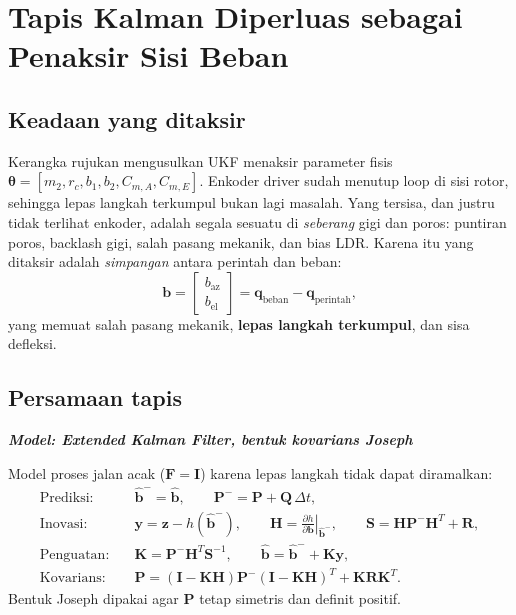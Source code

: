 \documentclass[11pt,a4paper]{article}
\newcommand{\model}[1]{\textbf{\textit{Model: #1}}}
\begin{document}
\section{Tapis Kalman Diperluas sebagai Penaksir Sisi Beban}
\label{sec:ekf}

\subsection{Keadaan yang ditaksir}

Kerangka rujukan mengusulkan UKF menaksir parameter fisis
$\bm{\theta} = [m_2, r_c, b_1, b_2, C_{m,A}, C_{m,E}]$. Enkoder driver sudah menutup loop di sisi rotor,
sehingga lepas langkah terkumpul bukan lagi masalah. Yang tersisa, dan justru tidak terlihat enkoder,
adalah segala sesuatu di \emph{seberang} gigi dan poros: puntiran poros, backlash gigi, salah pasang
mekanik, dan bias LDR. Karena itu yang ditaksir adalah
\emph{simpangan} antara perintah dan beban:
\begin{equation}
\bm{b} = \begin{bmatrix} b_{\mathrm{az}} \\ b_{\mathrm{el}} \end{bmatrix}
= \bm{q}_{\mathrm{beban}} - \bm{q}_{\mathrm{perintah}},
\end{equation}
yang memuat salah pasang mekanik, \textbf{lepas langkah terkumpul}, dan sisa defleksi.

\subsection{Persamaan tapis}

\model{Extended Kalman Filter, bentuk kovarians Joseph}

Model proses jalan acak ($\bm{F} = \bm{I}$) karena lepas langkah tidak dapat diramalkan:
\begin{align}
\text{Prediksi:} \quad & \hat{\bm{b}}^- = \hat{\bm{b}}, \qquad
\bm{P}^- = \bm{P} + \bm{Q}\,\Delta t, \\
\text{Inovasi:} \quad & \bm{y} = \bm{z} - h(\hat{\bm{b}}^-), \qquad
\bm{H} = \left.\frac{\partial h}{\partial \bm{b}}\right|_{\hat{\bm{b}}^-}, \qquad
\bm{S} = \bm{H}\bm{P}^-\bm{H}^T + \bm{R}, \\
\text{Penguatan:} \quad & \bm{K} = \bm{P}^-\bm{H}^T\bm{S}^{-1}, \qquad
\hat{\bm{b}} = \hat{\bm{b}}^- + \bm{K}\bm{y}, \\
\text{Kovarians:} \quad & \bm{P} = (\bm{I}-\bm{K}\bm{H})\bm{P}^-(\bm{I}-\bm{K}\bm{H})^T + \bm{K}\bm{R}\bm{K}^T .
\end{align}
Bentuk Joseph dipakai agar $\bm{P}$ tetap simetris dan definit positif.
\end{document}
